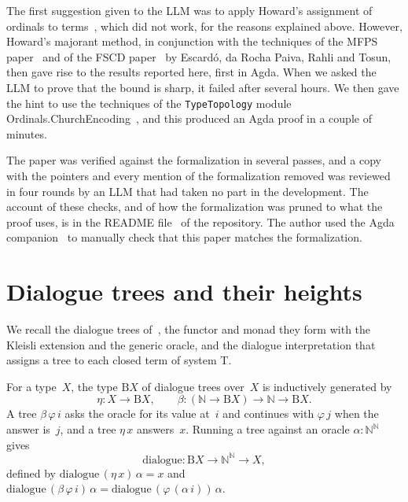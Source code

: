 \documentclass[11pt]{amsart}
\makeatletter
\newcommand{\N}{\mathbb{N}}
\newcommand{\Baire}{\N^{\N}}
\newcommand{\Dial}{\mathrm{B}}
\newif\ifagdarefs
\newcommand{\AgdaRefs}[1]{\ifagdarefs{\footnotesize\color{agdablue}(#1)}\else\unskip\fi}
\newcommand{\Agda}[2]{{\footnotesize\color{agdablue}\textsf{#1}%
  \ifblank{#2}{}{\texttt{.}\allowbreak\texttt{#2}}}}
\newcommand{\AgdaModule}[1]{{\footnotesize\color{agdablue}\textsf{#1}}}
\let\ttt@plain\texttt
\renewcommand{\texttt}[1]{{\footnotesize\color{agdablue}\ttt@plain{#1}}}
\theoremstyle{plain}
\theoremstyle{definition}
\makeatother
\begin{document}
The first suggestion given to the LLM was to apply Howard's assignment
of ordinals to terms~\cite{Howard1970}, which did not work, for the
reasons explained above. However, Howard's majorant method, in
conjunction with the techniques of the MFPS paper~\cite{Escardo2013}
and of the FSCD paper~\cite{EscardoPaivaRahliTosun2025} by Escard\'o,
da Rocha Paiva, Rahli and Tosun, then gave rise to the results
reported here, first in Agda. When we asked the LLM to prove that the
bound is sharp, it failed after several hours. We then gave the hint
to use the techniques of the \texttt{TypeTopology} module
\AgdaModule{Ordinals.ChurchEncoding}~\cite{ChurchEncoding2011}, and
this produced an Agda proof in a couple of minutes.

The paper was verified against the formalization in several passes,
and a copy with the pointers and every mention of the formalization
removed was reviewed in four rounds by an LLM that had taken no part
in the development. The account of these checks, and of how the
formalization was pruned to what the proof uses, is in the README
file~\cite{Escardo2026Repository} of the repository. The author used
the Agda companion~\cite{Escardo2026Companion} to manually check that
this paper matches the formalization.

\section{Dialogue trees and their heights}
\label{sec:dialogue}

We recall the dialogue trees of~\cite{Escardo2013}, the functor and
monad they form with the Kleisli extension and the generic oracle, and
the dialogue interpretation that assigns a tree to each closed term of
system T.

\begin{definition}
\label{def:dialogue-tree-type}
For a type~$X$, the type $\Dial X$ of dialogue trees over~$X$ is
inductively generated by
\[
  \eta : X \to \Dial X , \qquad
  \beta : (\N \to \Dial X) \to \N \to \Dial X .
\]
A tree $\beta\,\varphi\,i$ asks the oracle for its value at~$i$ and
continues with $\varphi\,j$ when the answer is~$j$, and a tree $\eta\,x$
answers~$x$. Running a tree against an oracle $\alpha : \Baire$ gives
\[
  \mathrm{dialogue} : \Dial X \to \Baire \to X ,
\]
defined by $\mathrm{dialogue}\,(\eta\,x)\,\alpha = x$ and
$\mathrm{dialogue}\,(\beta\,\varphi\,i)\,\alpha =
 \mathrm{dialogue}\,(\varphi\,(\alpha\,i))\,\alpha$.
\AgdaRefs{\Agda{EffectfulForcing.MFPSAndVariations.Dialogue}{D};
\texttt{B}, \texttt{dialogue}.}
\end{definition}
\end{document}
